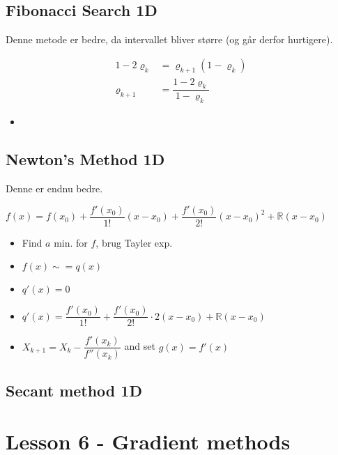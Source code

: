 \documentclass[10pt, a4]{Memoir}
\begin{document}
\subsection{Fibonacci Search 1D}
Denne metode er bedre, da intervallet bliver større (og går derfor hurtigere).

\begin{align*}
1-2 \varrho_k &= \varrho_{k+1}(1-\varrho_k) \\
\varrho_{k+1} &= \dfrac{1-2 \varrho_k}{1-\varrho_k}
\end{align*}

\begin{itemize}
	\item 

\end{itemize}



\subsection{Newton's Method 1D}
Denne er endnu bedre.

$f(x) = f(x_0) + \dfrac{f'(x_0)}{1!}(x-x_0) + \dfrac{f'(x_0)}{2!}(x-x_0)^2 + \mathbb{R}(x-x_0) $

\begin{itemize}
	\item Find $a$ min. for $f$, brug Tayler exp.
	\item $f(x) \sim{=} q(x)$
	\item $q'(x)=0 $
	\item $q'(x) = \dfrac{f'(x_0)}{1!} + \dfrac{f'(x_0)}{2!}\cdot 2(x-x_0) + \mathbb{R}(x-x_0)$
	\item $X_{k+1} = X_k-\dfrac{f'(x_k)}{f''(x_k)}$ and set $g(x) = f'(x)$
\end{itemize}


\subsection{Secant method 1D}





\newpage
\section*{Lesson 6 - Gradient methods}
\end{document}
